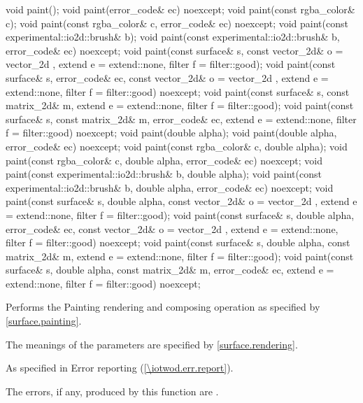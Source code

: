 \begin{itemdecl}
void paint();
void paint(error_code& ec) noexcept;
void paint(const rgba_color& c);
void paint(const rgba_color& c, error_code& ec) noexcept;
void paint(const experimental::io2d::brush& b);
void paint(const experimental::io2d::brush& b, error_code& ec) noexcept;
void paint(const surface& s, const vector_2d& o = vector_2d{ },
  extend e = extend::none, filter f = filter::good);
void paint(const surface& s, error_code& ec,
  const vector_2d& o = vector_2d{ }, extend e = extend::none,
  filter f = filter::good) noexcept;
void paint(const surface& s, const matrix_2d& m, extend e = extend::none,
  filter f = filter::good);
void paint(const surface& s, const matrix_2d& m, error_code& ec,
  extend e = extend::none, filter f = filter::good) noexcept;
void paint(double alpha);
void paint(double alpha, error_code& ec) noexcept;
void paint(const rgba_color& c, double alpha);
void paint(const rgba_color& c, double alpha, error_code& ec) noexcept;
void paint(const experimental::io2d::brush& b, double alpha);
void paint(const experimental::io2d::brush& b, double alpha,
  error_code& ec) noexcept;
void paint(const surface& s, double alpha,
  const vector_2d& o = vector_2d{ }, extend e = extend::none,
  filter f = filter::good);
void paint(const surface& s, double alpha, error_code& ec,
  const vector_2d& o = vector_2d{ }, extend e = extend::none,
  filter f = filter::good) noexcept;
void paint(const surface& s, double alpha, const matrix_2d& m,
  extend e = extend::none, filter f = filter::good);
void paint(const surface& s, double alpha, const matrix_2d& m,
  error_code& ec, extend e = extend::none, filter f = filter::good)
  noexcept;
\end{itemdecl}
\begin{itemdescr}
\pnum
\effects
Performs the Painting rendering and composing operation as specified by \ref{surface.painting}.

\pnum
The meanings of the parameters are specified by \ref{surface.rendering}.

\pnum
\throws
As specified in Error reporting (\ref{\iotwod.err.report}).

\pnum
\errors
The errors, if any, produced by this function are .
\end{itemdescr}

